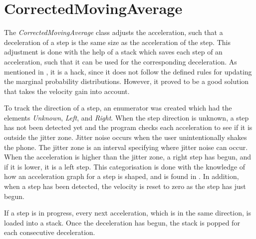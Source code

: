 \section{CorrectedMovingAverage}
The \textit{CorrectedMovingAverage} class adjusts the acceleration, such that a deceleration of a step is the same size as the acceleration of the step.
This adjustment is done with the help of a stack which saves each step of an acceleration, such that it can be used for the corresponding deceleration.
As mentioned in , it is a hack, since it does not follow the defined rules for updating the marginal probability distributions.
However, it proved to be a good solution that takes the velocity gain into account.

To track the direction of a step, an enumerator was created which had the elements \textit{Unknown}, \textit{Left}, and \textit{Right}. 
When the step direction is unknown, a step has not been detected yet and the program checks each acceleration to see if it is outside the jitter zone.
Jitter noise occurs when the user unintentionally shakes the phone.
The jitter zone is an interval specifying where jitter noise can occur.
When the acceleration is higher than the jitter zone, a right step has begun, and if it is lower, it is a left step.
This categorisation is done with the knowledge of how an acceleration graph for a step is shaped, and is found in .
In addition, when a step has been detected, the velocity is reset to zero as the step has just begun.

If a step is in progress, every next acceleration, which is in the same direction, is loaded into a stack.
Once the deceleration has begun, the stack is popped for each consecutive deceleration.
